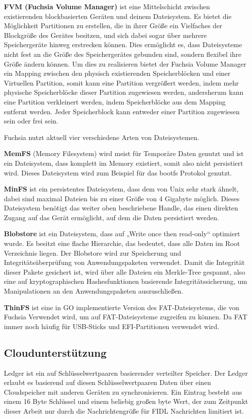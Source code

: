 \documentclass[a4paper]{scrartcl}
\begin{document}
\textbf{FVM (Fuchsia Volume Manager)} ist eine Mittelschicht zwischen existierenden blockbasierten Geräten und deinem Dateisystem. Es bietet die Möglichkeit Partitionen zu erstellen, die in ihrer Größe ein Vielfaches der Blockgröße des Gerätes besitzen, und sich dabei sogar über mehrere Speichergeräte hinweg erstrecken können. Dies ermöglicht es, dass Dateisysteme nicht fest an die Größe des Speichergerätes gebunden sind, sondern flexibel ihre Größe ändern können. Um dies zu realisieren bietet der Fuchsia Volume Manager ein Mapping zwischen den physisch existierenden Speicherblöcken und einer Virtuellen Partition, somit kann eine Partition vergrößert werden, indem mehr physische Speicherblöcke dieser Partition zugewiesen werden, andersherum kann eine Partition verkleinert werden, indem Speicherblöcke aus dem Mapping entfernt werden. Jeder Speicherblock kann entweder einer Partition zugewiesen sein oder frei sein.

Fuchsia nutzt aktuell vier verschiedene Arten von Dateisystemen.

\textbf{MemFS} (Memory Filesystem) wird meist für Temporäre Daten genutzt und ist ein Dateisystem, dass komplett im Memory existiert, somit also nicht persistiert wird. Dieses Dateisystem wird zum Beispiel für das bootfs Protokol genutzt.

\textbf{MinFS} ist ein persistentes Dateisystem, dass dem von Unix sehr stark ähnelt, dabei sind maximal Dateien bis zu einer Größe von 4 Gigabyte möglich. Dieses Dateisystem benötigt das weiter oben beschriebene Handle, das einen direkten Zugang auf das Gerät ermöglicht, auf dem die Daten persistiert werden.

\textbf{Blobstore} ist ein Dateisystem, dass auf „Write once then read-only“ optimiert wurde. Es besitzt eine flache Hierarchie, das bedeutet, dass alle Daten im Root Verzeichnis liegen. Der Blobstore wird zur Speicherung und Integritätsüberprüfung von Anwendungspaketen verwendet. Damit die Integrität dieser Pakete gesichert ist, wird über alle Dateien ein Merkle-Tree gespannt, also eine auf kryptographischen Hashesfunktionen basierende Integritätssicherung, um Manipulationen an den Anwendungspaketen auszuschließen.

\textbf{ThinFS} ist eine in GO implementierte Version des FAT-Dateisystems, die von Fuchsia Verwendet wird, um auf FAT-Dateisysteme zugreifen zu können. Da FAT immer noch häufig für USB-Sticks und EFI-Partitionen verwendet wird.
\subsection{Cloudunterstützung}
\label{sec:Ledger}
Ledger ist ein auf Schlüsselwertpaaren basierender verteilter Speicher. Der Ledger erlaubt es basierend auf diesen Schlüsselwertpaaren Daten über einen Cloudspeicher mit anderen Geräten zu synchronisieren. Ein Eintrag besteht aus einem 16 Byte Schlüssel und einem beliebig großen byte Wert, der zum Zeitpunkt dieser Arbeit nur durch die Nachrichtengröße für FIDL Nachrichten limitiert ist.
\end{document}
